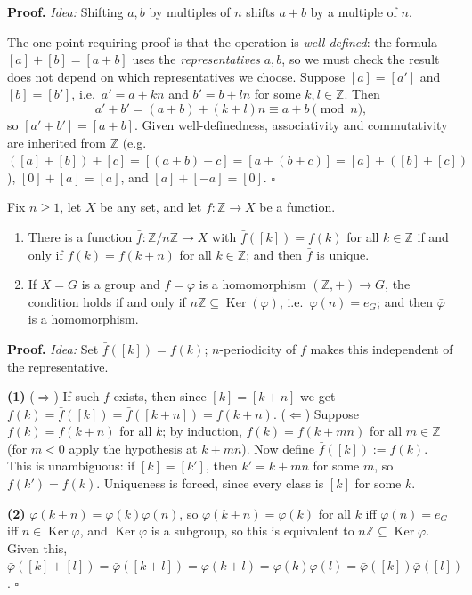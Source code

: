 \documentclass[11pt]{report}
\renewenvironment{proof}[1][Proof]{\noindent\textbf{#1.} }{\hfill$\square$\par\vspace{5pt}}
\begin{document}
\begin{proof}
\textit{Idea:} Shifting $a, b$ by multiples of $n$ shifts $a + b$ by a multiple of $n$.\par
The one point requiring proof is that the operation is \emph{well defined}: the formula $[a] + [b] = [a+b]$ uses the \emph{representatives} $a, b$, so we must check the result does not depend on which representatives we choose. Suppose $[a] = [a']$ and $[b] = [b']$, i.e.\ $a' = a + kn$ and $b' = b + ln$ for some $k, l \in \mathbb{Z}$. Then
\[ a' + b' = (a + b) + (k + l)n \equiv a + b \pmod{n}, \]
so $[a' + b'] = [a + b]$. Given well-definedness, associativity and commutativity are inherited from $\mathbb{Z}$ (e.g.\ $([a]+[b])+[c] = [(a+b)+c] = [a+(b+c)] = [a]+([b]+[c])$), $[0] + [a] = [a]$, and $[a] + [-a] = [0]$.
\end{proof}

\begin{lembox}\label{lem:descending-map-z-nz}
Fix $n \geq 1$, let $X$ be any set, and let $f: \mathbb{Z} \to X$ be a function.
\begin{enumerate}
    \item There is a function $\bar f: \mathbb{Z}/n\mathbb{Z} \to X$ with $\bar f([k]) = f(k)$ for all $k \in \mathbb{Z}$ if and only if $f(k) = f(k + n)$ for all $k \in \mathbb{Z}$; and then $\bar f$ is unique.
    \item If $X = G$ is a group and $f = \varphi$ is a homomorphism $(\mathbb{Z}, +) \to G$, the condition holds if and only if $n\mathbb{Z} \subseteq \operatorname{Ker}(\varphi)$, i.e.\ $\varphi(n) = e_G$; and then $\bar\varphi$ is a homomorphism.
\end{enumerate}
\end{lembox}

\begin{proof}
\textit{Idea:} Set $\bar f([k]) = f(k)$; $n$-periodicity of $f$ makes this independent of the representative.\par
\textbf{(1)} ($\Rightarrow$) If such $\bar f$ exists, then since $[k] = [k+n]$ we get $f(k) = \bar f([k]) = \bar f([k+n]) = f(k+n)$. ($\Leftarrow$) Suppose $f(k) = f(k+n)$ for all $k$; by induction, $f(k) = f(k + mn)$ for all $m \in \mathbb{Z}$ (for $m < 0$ apply the hypothesis at $k + mn$). Now define $\bar f([k]) := f(k)$. This is unambiguous: if $[k] = [k']$, then $k' = k + mn$ for some $m$, so $f(k') = f(k)$. Uniqueness is forced, since every class is $[k]$ for some $k$.

\textbf{(2)} $\varphi(k + n) = \varphi(k)\varphi(n)$, so $\varphi(k+n) = \varphi(k)$ for all $k$ iff $\varphi(n) = e_G$ iff $n \in \operatorname{Ker}\varphi$, and $\operatorname{Ker}\varphi$ is a subgroup, so this is equivalent to $n\mathbb{Z} \subseteq \operatorname{Ker}\varphi$. Given this, $\bar\varphi([k] + [l]) = \bar\varphi([k+l]) = \varphi(k+l) = \varphi(k)\varphi(l) = \bar\varphi([k])\bar\varphi([l])$.
\end{proof}
\end{document}
